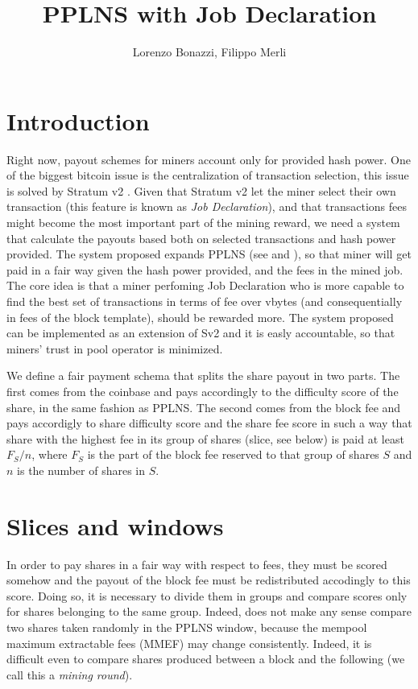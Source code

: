 \documentclass[11pt]{article} %
\title{PPLNS with Job Declaration}
\author{Lorenzo Bonazzi, Filippo Merli}
\begin{document}
\maketitle

\section{Introduction}

Right now, payout schemes for miners account only for provided hash power.
One of the biggest bitcoin issue is the centralization of transaction selection, this issue is solved by Stratum v2 \cite{sv2spec}. Given that Stratum v2 let the miner select their own transaction (this feature is known as \emph{Job Declaration}), and that transactions fees might become the most important part of the mining reward, we need a system that calculate the payouts based both on selected transactions and hash power provided. The system proposed expands PPLNS (see \cite{rosenfeld} and \cite{ocean}), so that miner will get paid in a fair way given the hash power provided, and the fees in the mined job. The core idea is that a miner perfoming Job Declaration who is more capable to find the best set of transactions in terms of fee over vbytes (and consequentially in fees of the block template), should be rewarded more. The system proposed can be implemented as an extension of Sv2 \cite{extension} and it is easly accountable, so that miners' trust in pool operator is minimized. 

We define a fair payment schema that splits the share payout in two parts. The first comes from the coinbase and pays accordingly to the difficulty score of the share, in the same fashion as PPLNS. The second comes from the block fee and pays accordigly to share difficulty score and the share fee score in such a way that share with the highest fee in its group of shares (slice, see below) is paid at least $F_S/n$, where $F_S$ is the part of the block fee reserved to that group of shares $S$ and $n$ is the number of shares in $S$.

\section{Slices and windows}
In order to pay shares in a fair way with respect to fees, they must be scored somehow and the payout of the block fee must be redistributed accodingly to this score. Doing so, it is necessary to divide them in groups and compare scores only for shares belonging to the same group. Indeed, does not make any sense compare two shares taken randomly in the PPLNS window, because the mempool maximum extractable fees (MMEF) may change consistently. Indeed, it is difficult even to compare shares produced between a block and the following (we call this a \emph{mining round}).
\end{document}
